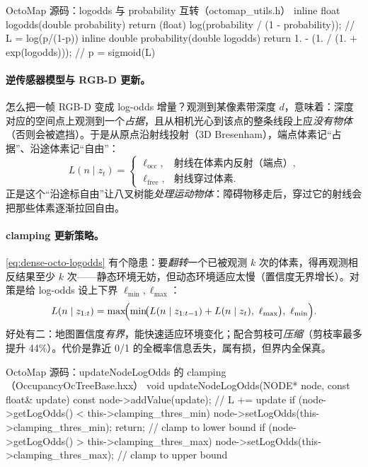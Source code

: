 \begin{codebox}[C++]{OctoMap 源码：logodds 与 probability 互转（octomap\_utils.h）}
inline float logodds(double probability) {
  return (float) log(probability / (1 - probability));    // L = log(p/(1-p))
}
inline double probability(double logodds) {
  return 1. - (1. / (1. + exp(logodds)));                 // p = sigmoid(L)
}
\end{codebox}

\paragraph{逆传感器模型与 RGB-D 更新。}
怎么把一帧 RGB-D 变成 log-odds 增量？观测到某像素带深度 $d$，意味着：深度对应的空间点上观测到一个\emph{占据}，且从相机光心到该点的整条线段上应\emph{没有物体}（否则会被遮挡）。于是从原点沿射线投射（3D Bresenham），端点体素记“占据”、沿途体素记“自由”：
\begin{equation}
  L(n\mid z_t)=\begin{cases} \ell_{\mathrm{occ}}, & \text{射线在体素内反射（端点）},\\ \ell_{\mathrm{free}}, & \text{射线穿过体素}.\end{cases}
  \label{eq:dense-octo-sensor}
\end{equation}
正是这个“沿途标自由”让八叉树能\emph{处理运动物体}：障碍物移走后，穿过它的射线会把那些体素逐渐拉回自由。

\paragraph{clamping 更新策略。}
\cref{eq:dense-octo-logodds} 有个隐患：要\emph{翻转}一个已被观测 $k$ 次的体素，得再观测相反结果至少 $k$ 次——静态环境无妨，但动态环境适应太慢（置信度无界增长）。对策是给 log-odds 设上下界 $\ell_{\min},\ell_{\max}$：
\begin{equation}
  L(n\mid z_{1:t})=\max\!\Bigl(\min\!\bigl(L(n\mid z_{1:t-1})+L(n\mid z_t),\ \ell_{\max}\bigr),\ \ell_{\min}\Bigr).
  \label{eq:dense-octo-clamp}
\end{equation}
好处有二：地图置信度\emph{有界}，能快速适应环境变化；配合剪枝可\emph{压缩}（剪枝率最多提升 44\%）。代价是靠近 0/1 的全概率信息丢失，属有损，但界内全保真。

\begin{codebox}[C++]{OctoMap 源码：updateNodeLogOdds 的 clamping（OccupancyOcTreeBase.hxx）}
void updateNodeLogOdds(NODE* node, const float& update) const {
  node->addValue(update);                                 // L += update
  if (node->getLogOdds() < this->clamping_thres_min) {
    node->setLogOdds(this->clamping_thres_min); return;   // clamp to lower bound
  }
  if (node->getLogOdds() > this->clamping_thres_max) {
    node->setLogOdds(this->clamping_thres_max);           // clamp to upper bound
  }
}
\end{codebox}


